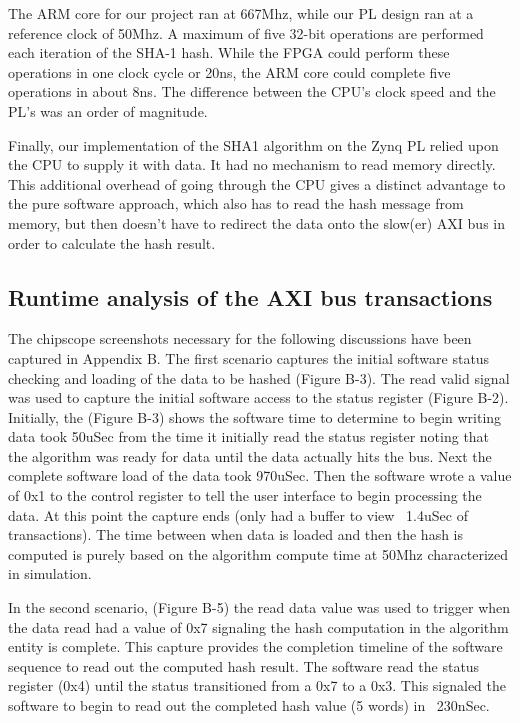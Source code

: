 \documentclass[journal]{IEEEtran}
\begin{document}
The ARM core for our project ran at 667Mhz, while our PL design ran at a reference clock of 50Mhz.  A maximum of five 32-bit operations are performed each iteration of the SHA-1 hash.  While the FPGA could perform these operations in one clock cycle or 20ns, the ARM core could complete five operations in about 8ns.  The difference between the CPU’s clock speed and the PL’s was an order of magnitude.

Finally, our implementation of the SHA1 algorithm on the Zynq PL relied upon the CPU to supply it with data.  It had no mechanism to read memory directly.  This additional overhead of going through the CPU gives a distinct advantage to the pure software approach, which also has to read the hash message from memory, but then doesn't have to redirect the data onto the slow(er) AXI bus in order to calculate the hash result.
\subsection{Runtime analysis of the AXI bus transactions}
The chipscope screenshots necessary for the following discussions have been captured in Appendix B. The first scenario captures the initial software status checking and loading of the data to be hashed  (Figure B-3).  The read valid signal was used to capture the initial software access to the status register (Figure B-2).  Initially, the (Figure B-3) shows the software time to determine to begin writing data took 50uSec from the time it initially read the status register noting that the algorithm was ready for data until the data actually hits the bus.  Next the complete software load of the data took 970uSec.  Then the software wrote a value of 0x1 to the control register to tell the user interface to begin processing the data.  At this point the capture ends (only had a buffer to view ~1.4uSec of transactions).  The time between when data is loaded and then the hash is computed is purely based on the algorithm compute time at 50Mhz characterized in simulation.

In the second scenario,   (Figure B-5) the read data value was used to trigger when the data read had a value of 0x7 signaling the hash computation in the algorithm entity is complete.  This capture provides the completion timeline of the software sequence to read out the computed hash result.  The software read the status register (0x4) until the status transitioned from a 0x7 to a 0x3.  This signaled the software to begin to read out the completed hash value (5 words) in ~230nSec.
\end{document}
